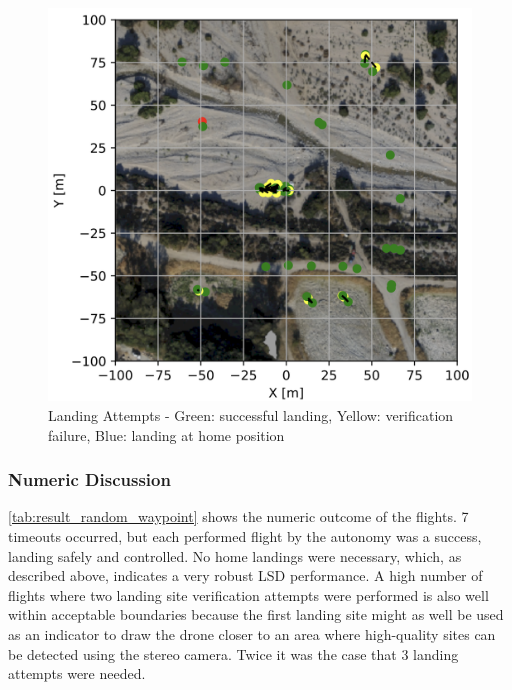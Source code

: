     \begin{figure}[h]
        \begin{center}
            \includegraphics[scale=0.5]{images/evaluation/landings_random_WP_GT.png}
            \caption{Landing Attempts - Green: successful landing, Yellow: verification failure, Blue: landing at home position}
            \label{fig:landing_attempts_random_WP}
        \end{center}
    \end{figure}

    \subsubsection{Numeric Discussion}
    \cref{tab:result_random_waypoint} shows the numeric outcome of the flights. 7 timeouts occurred, but each performed flight by the autonomy was a success, landing safely and controlled. No home landings were necessary, which, as described above, indicates a very robust LSD performance. A high number of flights where two landing site verification attempts were performed is also well within acceptable boundaries because the first landing site might as well be used as an indicator to draw the drone closer to an area where high-quality sites can be detected using the stereo camera. Twice it was the case that 3 landing attempts were needed.

